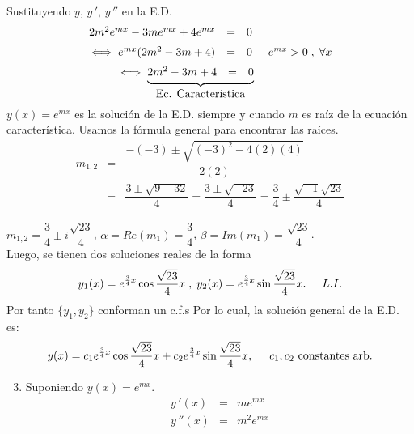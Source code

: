 \documentclass{beamer}
\begin{document}
\begin{frame}[t]
	\begin{exampleblock}{}
		Sustituyendo \(y\), \(y\,'\), \(y\,''\) en la E.D. 
		\[
			\begin{array}{rcl}
				2m^2e^{mx} -3me^{mx} +4e^{mx} & = & 0 \\[2mm]
				\iff e^{mx} (2m^2-3m+4) & = & 0 \hspace{5mm} e^{mx} >0 \;,\; \forall x\\[2mm]
				\iff \underbrace{\begin{matrix} 2m^2-3m+4 & = & 0 \end{matrix}} _{\mbox{Ec. Característica}} \hspace{-12mm}
			\end{array}
		\]
		\(y(x) = e^{mx}\) es la solución de la E.D. siempre y cuando \(m\) es raíz de la ecuación característica. Usamos la fórmula general para encontrar las raíces.
		\[
			\begin{array}{rcl}
				m_{1,2} & = & \dfrac{-(-3) \pm \sqrt{(-3) ^2-4(2) (4)}}{2(2)} \\[2mm]
				& = & \dfrac{3 \pm \sqrt{9-32}}{4} = \dfrac{3 \pm \sqrt{-23}}{4} = \dfrac{3}{4} \pm \dfrac{\sqrt{-1} \sqrt{23}}{4}
			\end{array}
		\]
	\end{exampleblock}
\end{frame}

\begin{frame}[t]
	\begin{exampleblock}{}
		\(m_{1,2} = \dfrac{3}{4} \pm i \dfrac{\sqrt{23}}{4}\), \(\alpha = Re(m_1) = \dfrac{3}{4}\), \(\beta = Im(m_1) = \dfrac{\sqrt{23}}{4}\). \\[2mm]
		Luego, se tienen dos soluciones reales de la forma
		\[
			y_1(x) = e^{\frac34 x} \cos \dfrac{\sqrt{23}}{4} x \;,\; y_2(x) = e^{\frac 34x} \sin \dfrac{\sqrt{23}}{4} x. \hspace{5mm} L.I.
		\]
		Por tanto \(\{y_1,y_2\}\) conforman un c.f.s Por lo cual, la solución general de la E.D. es:
		\[
			y(x) = c_1e^{\frac 34x} \cos \dfrac{\sqrt{23}}{4} x + c_2 e^{\frac 34x} \sin \dfrac{\sqrt{23}}{4} x, \hspace{5mm} c_1,c_2 \mbox{ constantes arb.} \vspace{-5mm}
		\]
		\begin{enumerate}
			\setcounter{enumi}{2}
		\item Suponiendo \(y(x) = e^{mx}\).
			\[
				\begin{array}{rcl}
					y\,' (x) & = & me^{mx} \\
					y\,'' (x) & = & m^2e^{mx}
				\end{array}
			\]
		\end{enumerate}
	\end{exampleblock}
\end{frame}
\end{document}
